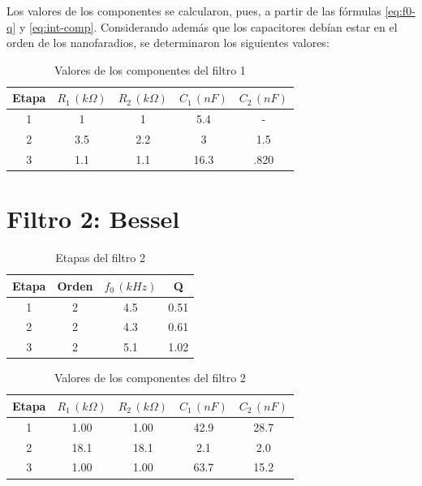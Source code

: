 \documentclass[../../tc_tp5_main.tex]{subfiles}
\begin{document}
Los valores de los componentes se calcularon, pues, a partir de las f\'ormulas \ref{eq:f0-q} y \ref{eq:int-comp}. Considerando adem\'as que los capacitores deb\'ian estar en el orden de los nanofaradios, se determinaron los siguientes valores:

\begin{table}[H]
	\centering
	\begin{tabular}{|c||c|c|c|c|}
	\hline
	Etapa & $R_1\, (k\Omega)$ & $R_2\, (k\Omega)$ & $C_1\, (nF)$ & $C_2\, (nF)$ \\ \hline \hline
	1     & 1                 & 1                 & 5.4          & -            \\ \hline
	2     & 3.5               & 2.2               & 3            & 1.5          \\ \hline
	3     & 1.1               & 1.1               & 16.3         & .820         \\ \hline
	\end{tabular}
	\caption{Valores de los componentes del filtro 1}
\end{table}


\section{Filtro 2: Bessel}


\begin{table}[H]
\centering
\begin{tabular}{|c||c|c|c|}
\hline
Etapa & Orden & $f_0\, (kHz)$ & Q    \\ \hline\hline
1     & 2     & 4.5           & 0.51 \\ \hline
2     & 2     & 4.3           & 0.61 \\ \hline
3     & 2     & 5.1           & 1.02 \\ \hline
\end{tabular}
\caption{Etapas del filtro 2}
\end{table}



\begin{table}[H]
	\centering
\begin{tabular}{|c||c|c|c|c|}
\hline
Etapa & $R_1\, (k\Omega)$ & $R_2\, (k\Omega)$ & $C_1\, (nF)$ & $C_2\, (nF)$ \\ \hline\hline
1     & 1.00              & 1.00              & 42.9         & 28.7         \\ \hline
2     & 18.1              & 18.1              & 2.1          & 2.0          \\ \hline
3     & 1.00              & 1.00              & 63.7         & 15.2         \\ \hline
\end{tabular}
\caption{Valores de los componentes del filtro 2}
\end{table}
\end{document}
